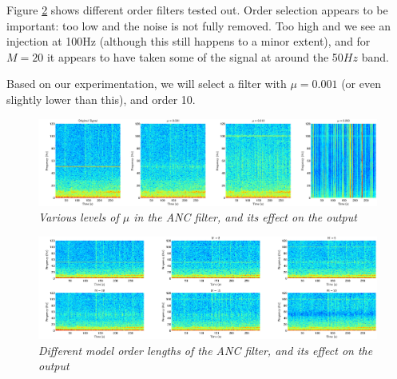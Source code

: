\documentclass[./main.tex]{subfiles}
\begin{document}
Figure \ref{fig:3_3_d_order} shows different order filters tested out. Order selection appears to be important: too low and the noise is not fully removed. Too high and we see an injection at 100Hz (although this still happens to a minor extent), and for $ M = 20 $ it appears to have taken some of the signal at around the 50$Hz$ band.

Based on our experimentation, we will select a filter with $ \mu = 0.001 $ (or even slightly lower than this), and order 10.

\begin{figure}[h]
	\centering 
	\includegraphics[scale=0.4]{fig/3/3_3_d_mu.png}
	\caption{\textit{Various levels of $\mu$ in the ANC filter, and its effect on the output}}
	\label{fig:3_3_d_mu}
\end{figure}

\begin{figure}[h]
	\centering 
	\includegraphics[scale=0.4]{fig/3/3_3_d_order.png}
	\caption{\textit{Different model order lengths of the ANC filter, and its effect on the output}}
	\label{fig:3_3_d_order}
\end{figure}
\end{document}
